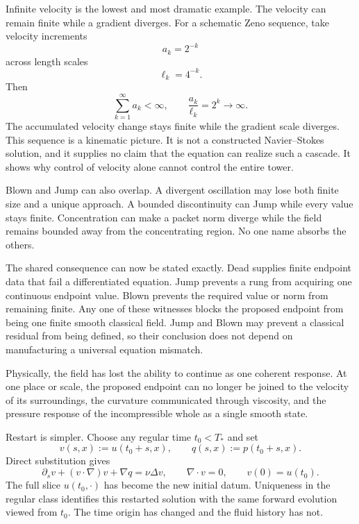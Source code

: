 Infinite velocity is the lowest and most dramatic example.
The velocity can remain finite while a gradient diverges.
For a schematic Zeno sequence, take velocity increments
\[
  a_k=2^{-k}
\]
across length scales
\[
  \ell_k=4^{-k}.
\]
Then
\[
  \sum_{k=1}^{\infty}a_k<\infty,
  \qquad
  \frac{a_k}{\ell_k}=2^k\longrightarrow\infty.
\]
The accumulated velocity change stays finite while the gradient scale diverges.
This sequence is a kinematic picture.
It is not a constructed Navier--Stokes solution, and it supplies no claim that the equation can realize such a cascade.
It shows why control of velocity alone cannot control the entire tower.

Blown and Jump can also overlap.
A divergent oscillation may lose both finite size and a unique approach.
A bounded discontinuity can Jump while every value stays finite.
Concentration can make a packet norm diverge while the field remains bounded away from the concentrating region.
No one name absorbs the others.

The shared consequence can now be stated exactly.
Dead supplies finite endpoint data that fail a differentiated equation.
Jump prevents a rung from acquiring one continuous endpoint value.
Blown prevents the required value or norm from remaining finite.
Any one of these witnesses blocks the proposed endpoint from being one finite smooth classical field.
Jump and Blown may prevent a classical residual from being defined, so their conclusion does not depend on manufacturing a universal equation mismatch.

Physically, the field has lost the ability to continue as one coherent response.
At one place or scale, the proposed endpoint can no longer be joined to the velocity of its surroundings, the curvature communicated through viscosity, and the pressure response of the incompressible whole as a single smooth state.


Restart is simpler.
Choose any regular time \(t_0<T_*\) and set
\[
  v(s,x):=u(t_0+s,x),
  \qquad
  q(s,x):=p(t_0+s,x).
\]
Direct substitution gives
\[
  \partial_sv+(v\cdot\nabla)v+\nabla q
  =
  \nu\Delta v,
  \qquad
  \nabla\cdot v=0,
  \qquad
  v(0)=u(t_0).
\]
The full slice \(u(t_0,\cdot)\) has become the new initial datum.
Uniqueness in the regular class identifies this restarted solution with the same forward evolution viewed from \(t_0\).
The time origin has changed and the fluid history has not.
